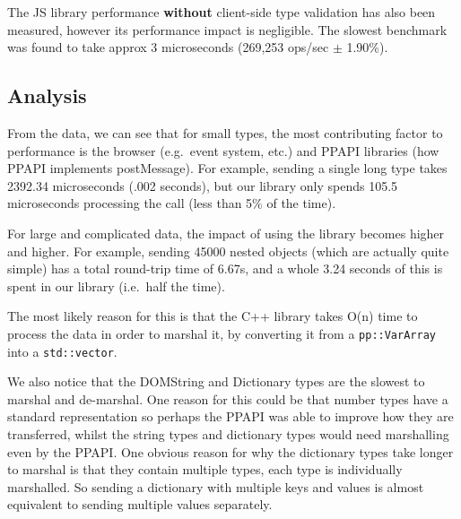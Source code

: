 The JS library performance \textbf{without} client-side type validation has also been measured, however its performance impact is negligible. The slowest benchmark was found to take approx 3 microseconds (269,253 ops/sec $\pm$  1.90\%).

\subsection{Analysis}\label{analysis}

From the data, we can see that for small types, the most contributing factor to performance is the browser (e.g.~event system, etc.) and PPAPI libraries (how PPAPI implements postMessage). For example, sending a single long type takes 2392.34 microseconds (.002 seconds), but our library only spends 105.5 microseconds processing the call (less than 5\% of the time).

For large and complicated data, the impact of using the library becomes higher and higher. For example, sending 45000 nested objects (which are actually quite simple) has a total round-trip time of 6.67s, and a whole 3.24 seconds of this is spent in our library (i.e.~half the time).

The most likely reason for this is that the C++ library takes O(n) time to process the data in order to marshal it, by converting it from a \lstinline{pp::VarArray} into a \lstinline{std::vector}.

We also notice that the DOMString and Dictionary types are the slowest to marshal and de-marshal. One reason for this could be that number types have a standard representation so perhaps the PPAPI was able to improve how they are transferred, whilst the string types and dictionary types would need marshalling even by the PPAPI. One obvious reason for why the dictionary types take longer to marshal is that they contain multiple types, each type is individually marshalled. So sending a dictionary with multiple keys and values is almost equivalent to sending multiple values separately.

